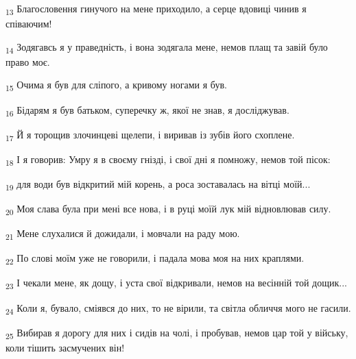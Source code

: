 \begin{tcolorbox}
\textsubscript{13} Благословення гинучого на мене приходило, а серце вдовиці чинив я співаючим!
\end{tcolorbox}
\begin{tcolorbox}
\textsubscript{14} Зодягавсь я у праведність, і вона зодягала мене, немов плащ та завій було право моє.
\end{tcolorbox}
\begin{tcolorbox}
\textsubscript{15} Очима я був для сліпого, а кривому ногами я був.
\end{tcolorbox}
\begin{tcolorbox}
\textsubscript{16} Бідарям я був батьком, суперечку ж, якої не знав, я досліджував.
\end{tcolorbox}
\begin{tcolorbox}
\textsubscript{17} Й я торощив злочинцеві щелепи, і виривав із зубів його схоплене.
\end{tcolorbox}
\begin{tcolorbox}
\textsubscript{18} І я говорив: Умру я в своєму гнізді, і свої дні я помножу, немов той пісок:
\end{tcolorbox}
\begin{tcolorbox}
\textsubscript{19} для води був відкритий мій корень, а роса зоставалась на вітці моїй...
\end{tcolorbox}
\begin{tcolorbox}
\textsubscript{20} Моя слава була при мені все нова, і в руці моїй лук мій відновлював силу.
\end{tcolorbox}
\begin{tcolorbox}
\textsubscript{21} Мене слухалися й дожидали, і мовчали на раду мою.
\end{tcolorbox}
\begin{tcolorbox}
\textsubscript{22} По слові моїм уже не говорили, і падала мова моя на них краплями.
\end{tcolorbox}
\begin{tcolorbox}
\textsubscript{23} І чекали мене, як дощу, і уста свої відкривали, немов на весінній той дощик...
\end{tcolorbox}
\begin{tcolorbox}
\textsubscript{24} Коли я, бувало, сміявся до них, то не вірили, та світла обличчя мого не гасили.
\end{tcolorbox}
\begin{tcolorbox}
\textsubscript{25} Вибирав я дорогу для них і сидів на чолі, і пробував, немов цар той у війську, коли тішить засмучених він!
\end{tcolorbox}
